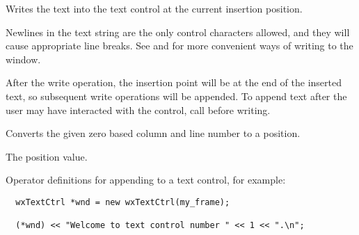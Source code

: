 Writes the text into the text control at the current insertion position.




Newlines in the text string
are the only control characters allowed, and they will cause appropriate
line breaks.  See  and  for more convenient ways of writing to the window.

After the write operation, the insertion point will be at the end of the inserted text, so subsequent write operations will be appended. To append text after the user may have interacted with the control, call  before writing.

\label{wxtextctrlxytoposition}


Converts the given zero based column and line number to a position.





The position value.

\label{wxtextctrlinsert}







Operator definitions for appending to a text control, for example:

\begin{verbatim}
  wxTextCtrl *wnd = new wxTextCtrl(my_frame);

  (*wnd) << "Welcome to text control number " << 1 << ".\n";
\end{verbatim}

